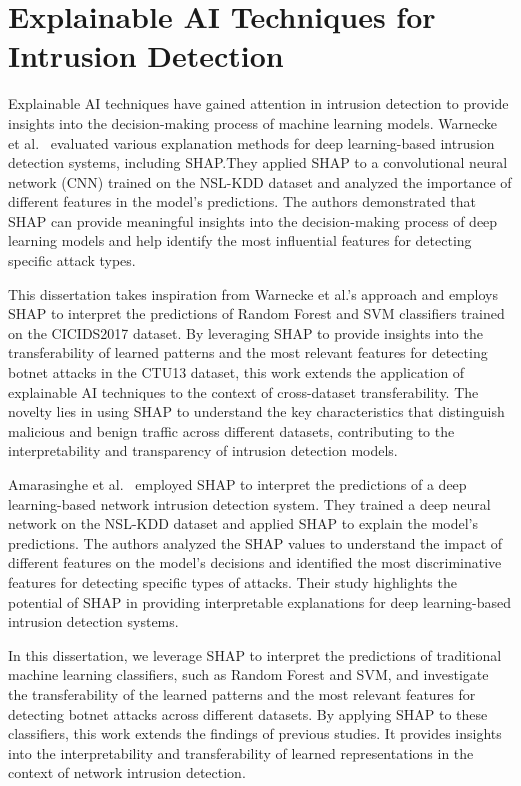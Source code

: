 \section{Explainable AI Techniques for Intrusion Detection}

Explainable AI techniques have gained attention in intrusion detection to provide insights into the decision-making process of machine learning models. Warnecke et al.~\cite{warnecke2020evaluating} evaluated various explanation methods for deep learning-based intrusion detection systems, including SHAP.\@ They applied SHAP to a convolutional neural network (CNN) trained on the NSL-KDD dataset and analyzed the importance of different features in the model’s predictions. The authors demonstrated that SHAP can provide meaningful insights into the decision-making process of deep learning models and help identify the most influential features for detecting specific attack types.

This dissertation takes inspiration from Warnecke et al.’s approach and employs SHAP to interpret the predictions of Random Forest and SVM classifiers trained on the CICIDS2017 dataset. By leveraging SHAP to provide insights into the transferability of learned patterns and the most relevant features for detecting botnet attacks in the CTU13 dataset, this work extends the application of explainable AI techniques to the context of cross-dataset transferability. The novelty lies in using SHAP to understand the key characteristics that distinguish malicious and benign traffic across different datasets, contributing to the interpretability and transparency of intrusion detection models.

Amarasinghe et al.~\cite{amarasinghe2018toward} employed SHAP to interpret the predictions of a deep learning-based network intrusion detection system. They trained a deep neural network on the NSL-KDD dataset and applied SHAP to explain the model’s predictions. The authors analyzed the SHAP values to understand the impact of different features on the model’s decisions and identified the most discriminative features for detecting specific types of attacks. Their study highlights the potential of SHAP in providing interpretable explanations for deep learning-based intrusion detection systems.

In this dissertation, we leverage SHAP to interpret the predictions of traditional machine learning classifiers, such as Random Forest and SVM, and investigate the transferability of the learned patterns and the most relevant features for detecting botnet attacks across different datasets. By applying SHAP to these classifiers, this work extends the findings of previous studies. It provides insights into the interpretability and transferability of learned representations in the context of network intrusion detection.

